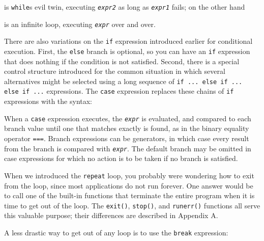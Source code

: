 \noindent is \texttt{while}{\textquotesingle}s evil twin, executing
\texttt{\textit{expr2}} as long as \texttt{\textit{expr1}}
fails; on the other hand


\noindent is an infinite loop, executing \texttt{\textit{expr}}
over and over.

There are also variations on the \texttt{if} expression introduced
earlier for conditional execution. First, the \texttt{else} branch is
optional, so you can have an \texttt{if} expression that does nothing
if the condition is not satisfied. Second, there is a special control
structure introduced for the common situation in which several
alternatives might be selected using a long sequence of \texttt{if ...
else if ... else if ...} expressions. The \texttt{case} expression replaces these chains of
\texttt{if} expressions with the syntax:


When a \texttt{case} expression executes, the \texttt{\textit{expr}} is
evaluated, and compared to each branch value until one that matches
exactly is found, as in the binary equality operator \texttt{===}.
Branch expressions can be generators, in which case every result from
the branch is compared with \texttt{\textit{expr}}. The default branch
may be omitted in case expressions for which no action is to be taken
if no branch is satisfied.

When we introduced the \texttt{repeat} loop, you probably were wondering
how to exit from the loop, since most applications do not run forever.
One answer would be to call one of the built-in functions that
terminate the entire program when it is time to get out of the loop.
The \texttt{exit()}, \texttt{stop()}, and \texttt{runerr()} functions
all serve this valuable purpose; their differences are described in
Appendix A.

A less drastic way to get out of any loop is to use the \texttt{break} expression:


